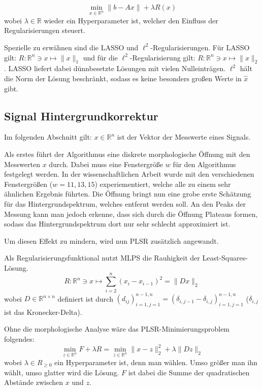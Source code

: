 \documentclass{article}
\newcommand{\R}[0]{\mathbb{R}}
\theoremstyle{plain}
\theoremstyle{definition}
\begin{document}
\begin{equation}
    \min\limits_{x \in \R^n} \lVert b - Ax \rVert + \lambda R(x)
\end{equation}
wobei $\lambda \in \R$ wieder ein Hyperparameter ist, welcher den Einfluss der Regularisierungen steuert.

Spezielle zu erwähnen sind die LASSO und $\ell^2$-Regularisierungen. Für LASSO gilt: $R: \R^n \ni x \mapsto \lVert x \rVert_1$ und für die $\ell^2$-Regularisierung gilt: $R: \R^n \ni x \mapsto \lVert x \rVert_2$.
LASSO liefert dabei dünnbesetzte Lösungen mit vielen Nulleinträgen. 
$\ell^2$ hält die Norm der Lösung beschränkt, sodass es keine besonders großen Werte in $\hat{x}$ gibt.

\cite[S. 184f.]{strang2019linear}

\subsection{Signal Hintergrundkorrektur}

Im folgenden Abschnitt gilt: $x \in \R^n$ ist der Vektor der Messwerte eines Signals. 

Als erstes führt der Algorithmus eine diskrete morphologische Öffnung mit den Messwerten $x$ durch. Dabei muss eine Fenstergröße $w$ für den Algorithmus festgelegt werden.
In der wissenschaftlichen Arbeit wurde mit den verschiedenen Fenstergrößen ($w=11,13,15$) experiementiert, welche alle zu einem sehr ähnlichen Ergebnis führten.
Die Öffnung bringt nun eine grobe erste Schätzung für das Hintergrundspektrum, welches entfernt werden soll.
An den Peaks der Messung kann man jedoch erkenne, dass sich durch die Öffnung Plateaus formen, sodass das Hintergrundspektrum dort nur sehr schlecht approximiert ist.

Um diesen Effekt zu mindern, wird nun PLSR zusätzlich angewandt.

Als Regularisierungsfunktional nutzt MLPS die Rauhigkeit der Least-Squares-Lösung.
\begin{equation}
    R: \R^n \ni x \mapsto \sum_{i=2}^{n} (x_i - x_{i-1})^2 = \lVert Dx \rVert_2
\end{equation}
wobei $D \in \R^{n\times n}$ definiert ist durch $(d_{ij})_{i=1,j=1}^{n-1,n} = (\delta_{i,j-1} - \delta_{i,j})_{i=1,j=1}^{n-1,n}$ ($\delta_{i,j}$ ist das Kronecker-Delta).

Ohne die morphologische Analyse wäre das PLSR-Minimierungsproblem folgendes:
\begin{equation}\label{eq:plsreq}
    \min\limits_{z \in \R^n} F + \lambda R = \min\limits_{z \in \R^n} \lVert x - z \rVert_2^2 + \lambda \lVert Dz \rVert_2    
\end{equation}
wobei $\lambda \in R_{\geq0}$ ein Hyperparameter ist, denn man wählen. Umso größer man ihn wählt, umso glatter wird die Lösung.
$F$ ist dabei die Summe der quadratischen Abstände zwischen $x$ und $z$.
\end{document}
